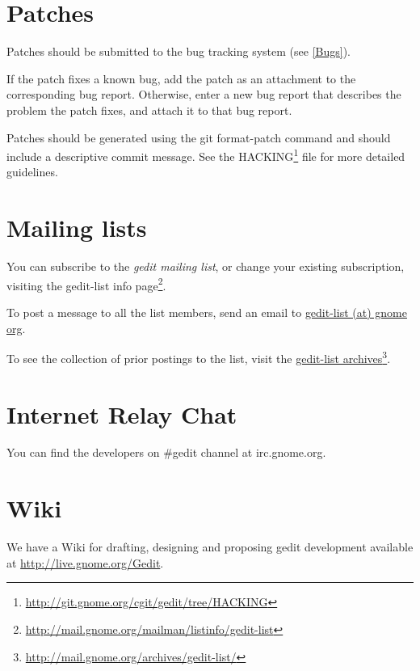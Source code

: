 \section{Patches}\label{Patches}

Patches should be submitted to the bug tracking system (see \ref{Bugs}).

If the patch fixes a known bug, add the patch as an attachment to the corresponding bug report. Otherwise, enter a new bug report that describes the problem the patch fixes, and attach it to that bug report.

Patches should be generated using the git format-patch command and should include a descriptive commit message. See the HACKING\footnote{\url{http://git.gnome.org/cgit/gedit/tree/HACKING}} file for more detailed guidelines.

\section{Mailing lists}\label{Mailing}

You can subscribe to the \emph{gedit mailing list}, or change your existing subscription, visiting the gedit-list info page\footnote{\url{http://mail.gnome.org/mailman/listinfo/gedit-list}}.

To post a message to all the list members, send an email to \href{mailto:gedit-list@gnome org}{gedit-list (at) gnome org}.

To see the collection of prior postings to the list, visit the \href{http://mail.gnome.org/archives/gedit-list/}{gedit-list archives}\footnote{\url{http://mail.gnome.org/archives/gedit-list/}}.

\section{Internet Relay Chat}\label{IRC}

You can find the developers on \#gedit channel at irc.gnome.org.

\section{Wiki}\label{Wiki}

We have a Wiki for drafting, designing and proposing gedit development available at \url{http://live.gnome.org/Gedit}.
